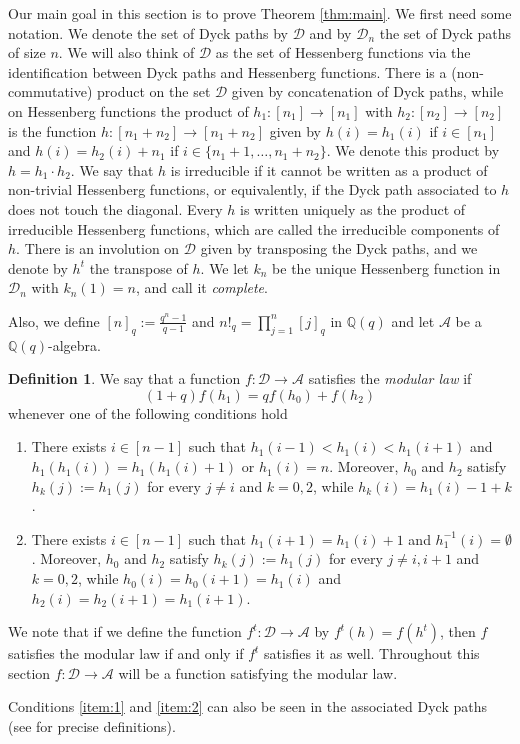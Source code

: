 \documentclass[10pt]{amsart}
\theoremstyle{definition}
\newtheorem{Def}[Lem]{Definition}
\newcommand{\A}{\mathcal A}
\newcommand{\col}{\colon}
\newcommand{\D}{\mathcal{D}}
\begin{document}
      Our main goal in this section is to prove Theorem \ref{thm:main}. We first need some notation.
      We denote the set of Dyck paths by $\D$ and by $\D_n$ the set of Dyck paths of size $n$. We will also think of $\D$ as the set of Hessenberg functions via the identification between Dyck paths and Hessenberg functions. There is a (non-commutative) product on the set $\D$ given by concatenation of Dyck paths, while on Hessenberg functions the product of $h_1\col [n_1]\to[n_1]$ with $h_2\col [n_2]\to [n_2]$ is the function $h\col [n_1+n_2]\to [n_1+n_2]$ given by $h(i)=h_1(i)$ if $i\in [n_1]$ and $h(i)=h_2(i)+n_1$ if $i\in \{n_1+1,\ldots, n_1+n_2\}$. We denote this product by $h=h_1\cdot h_2$. We say that $h$ is irreducible if it cannot be written as a product of non-trivial Hessenberg functions, or equivalently, if the Dyck path associated to $h$ does not touch the diagonal. Every $h$ is written uniquely as the product of irreducible Hessenberg functions, which are called the irreducible components of $h$. There is an involution on $\D$ given by transposing the Dyck paths, and we denote by $h^t$ the transpose of $h$. We let $k_n$ be the unique Hessenberg function in $\D_n$ with $k_n(1)=n$, and call it \emph{complete}.\par
        Also, we define $[n]_q:=\frac{q^n-1}{q-1}$ and $n!_q=\prod_{j=1}^n [j]_q$  in $\mathbb{Q}(q)$ and let $\A$ be a $\mathbb{Q}(q)$-algebra.
      \begin{Def}
      \label{def:modular}
      We say that a function $f\col \D\to \A$ satisfies the  \emph{modular law} if
      \begin{equation}
      \label{eq:rec}
      (1+q)f(h_1)=qf(h_0)+f(h_2)
      \end{equation}
      whenever one of the following conditions hold
      \begin{enumerate}
          \item\label{item:1} There exists $i\in [n-1]$ such that $h_1(i-1)<h_1(i)<h_1(i+1)$ and $h_1(h_1(i))=h_1(h_1(i)+1)$ or $h_1(i)=n$. Moreover, $h_0$ and $h_2$ satisfy $h_k(j):=h_1(j)$ for every $j\neq i$ and $k=0,2$, while $h_k(i)=h_1(i)-1+k$.
          \item\label{item:2} There exists $i\in [n-1]$ such that $h_1(i+1)=h_1(i)+1$ and $h_1^{-1}(i)=\emptyset$. Moreover, $h_0$ and $h_2$ satisfy $h_k(j):=h_1(j)$ for every $j\neq i,i+1$ and $k=0,2$, while $h_0(i)=h_0(i+1)=h_1(i)$ and $h_2(i)=h_2(i+1)=h_1(i+1)$.
      \end{enumerate}
      \end{Def}
      We note that if we define the function $f^t\col \D\to \A$ by $f^t(h)=f(h^t)$, then $f$ satisfies the modular law if and only if $f^t$ satisfies it as well.  Throughout this section $f\col \D\to \A$ will be a function satisfying the modular law.\par
     Conditions \eqref{item:1} and \eqref{item:2} can also be seen in the associated Dyck paths (see \cite[Equation 12]{AS2020} for precise definitions).\par
\end{document}
